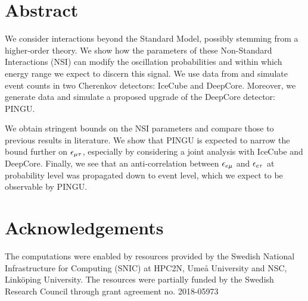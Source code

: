 \section*{Abstract}

We consider interactions beyond the Standard Model, possibly stemming from a higher-order theory.
We show how the parameters of these Non-Standard Interactions (NSI) can modify the oscillation probabilities and within which energy range we expect to discern this signal.
We use data from and simulate event counts in two Cherenkov detectors: IceCube and DeepCore. Moreover, we generate data and simulate a proposed upgrade of the DeepCore detector: PINGU. 

We obtain stringent bounds on the NSI parameters and compare those to previous results in literature. We show that PINGU is expected to narrow the bound further 
on $\epsilon_{\mu\tau}$, especially by considering a joint analysis with IceCube and DeepCore. Finally, we see that an anti-correlation between 
$\epsilon_{e\mu}$ and $\epsilon_{e\tau}$ at probability level was propagated down to event level, which we expect to be observable by PINGU.

\section*{Acknowledgements}
The computations were enabled by resources provided by the Swedish
National Infrastructure for Computing (SNIC) at HPC2N, Umeå University
and NSC, Linköping University. The resources were partially funded by the Swedish Research 
Council through grant agreement no. 2018-05973